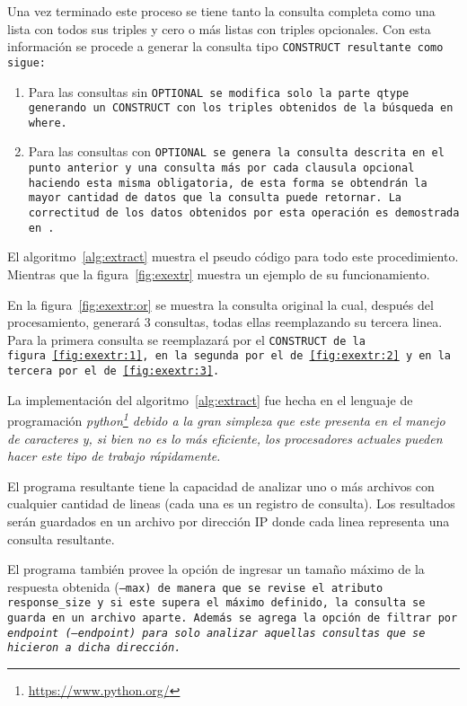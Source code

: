 Una vez terminado este proceso se tiene tanto la consulta completa como una
lista con todos sus triples  y cero o más listas con triples
opcionales.
Con esta información se procede a generar la consulta tipo \tt{CONSTRUCT}
resultante como sigue:
\begin{enumerate}
  \item
    Para las consultas sin \tt{OPTIONAL} se modifica solo la parte \tt{qtype}
    generando un \tt{CONSTRUCT} con los triples obtenidos de la búsqueda en
    \tt{where}.
  \item
    Para las consultas con \tt{OPTIONAL} se genera la consulta descrita en el
    punto anterior y una consulta más por cada clausula opcional haciendo esta
    misma obligatoria, de esta forma se obtendrán la mayor cantidad de datos
    que la consulta puede retornar.
    La correctitud de los datos obtenidos por esta operación es demostrada
		en~\cite{perez2006semantics}.
\end{enumerate}


El algoritmo~\ref{alg:extract} muestra el pseudo código para todo este
procedimiento. Mientras que la figura~\ref{fig:exextr} muestra un ejemplo de
su funcionamiento.



En la figura~\ref{fig:exextr:or} se muestra la consulta original la cual,
después del procesamiento, generará 3 consultas, todas ellas reemplazando su
tercera linea. Para la primera consulta se reemplazará por el \tt{CONSTRUCT} de
la figura~\ref{fig:exextr:1}, en la segunda por el de~\ref{fig:exextr:2} y en la
tercera por el de~\ref{fig:exextr:3}.



La implementación del algoritmo~\ref{alg:extract} fue hecha en el lenguaje de
programación \it{python}\footnote{\url{https://www.python.org/}}
debido a la gran simpleza que este presenta en el manejo de caracteres y, si
bien no es lo más eficiente, los procesadores actuales pueden hacer este tipo de
trabajo rápidamente.

El programa resultante tiene la capacidad de analizar uno o más archivos con
cualquier cantidad de lineas (cada una es un registro de consulta).
Los resultados serán guardados en un archivo por dirección IP donde cada linea
representa una consulta resultante.

El programa también provee la opción de ingresar un tamaño máximo de la 
respuesta obtenida (\tt{--max}) de manera que se revise el atributo 
\tt{response\_size} y si este supera el máximo definido, la consulta se guarda
en un archivo aparte.
Además se agrega la opción de filtrar por \it{endpoint} (\tt{--endpoint}) para 
solo analizar aquellas consultas que se hicieron a dicha dirección.

